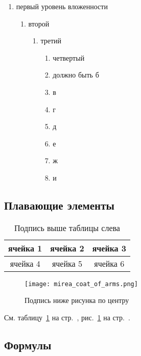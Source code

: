 \documentclass[14pt, a4paper, titlepage]{extarticle}
\begin{document}
\begin{enumerate}
    \item первый уровень вложенности
    \begin{enumerate}
        \item второй
        \begin{enumerate}
            \item третий
            \begin{enumerate}
                \item четвертый
                \item должно быть б
                \item в
                \item г
                \item д
                \item е
                \item ж
                \item и
            \end{enumerate}
        \end{enumerate}
    \end{enumerate}
\end{enumerate}

\subsection{Плавающие элементы}
 
\begin{table}[htb]
    \caption{Подпись выше таблицы слева}
    \begin{tabular}{ |c|c|c| } 
        \hline
        ячейка 1 & ячейка 2 & ячейка 3 \\ \hline
        ячейка 4 & ячейка 5 & ячейка 6 \\ \hline
    \end{tabular}
    \label{tab:test_label}
\end{table}
 
\begin{figure}[htb]
    \centering
    \texttt{[image: mirea\_coat\_of\_arms.png]}
    \caption{Подпись ниже рисунка по центру}
    \label{fig:test_label}
\end{figure}
 
См. таблицу~\ref{tab:test_label} на стр.~\pageref{tab:test_label}, рис.~\ref{fig:test_label} на стр.~\pageref{fig:test_label}.

\subsection{Формулы}
\end{document}

